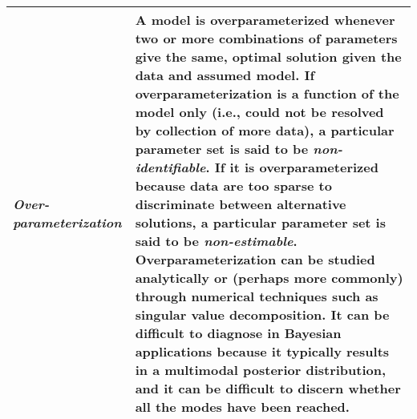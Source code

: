 \documentclass[12pt,english]{article}
\begin{document}
\begin{spacing}{1.9}
\begin{table}[htp]
\begin{tabular}{p{3cm}p{13cm}}
        \textit{Over-parameterization} & A model is overparameterized whenever two or more combinations of parameters give the same, optimal solution given the data and assumed model.  If overparameterization is a function of the model only (i.e., could not be resolved by collection of more data), a particular parameter set is said to be \textit{non-identifiable}.  If it is overparameterized because data are too sparse to discriminate between alternative solutions, a particular parameter set is said to be \textit{non-estimable}.  Overparameterization can be studied analytically or (perhaps more commonly) through numerical techniques such as singular value decomposition.  It can be difficult to diagnose in Bayesian applications because it typically results in a multimodal posterior distribution, and it can be difficult to discern whether all the modes have been reached. \\
        \hline
      \end{tabular}
    \end{table}


\end{spacing}
\end{document}
